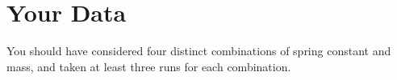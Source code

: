 \section{Your Data}
%
You should have considered four distinct combinations of spring constant and mass, and taken at least three runs for each combination.
%
%
\newpage
